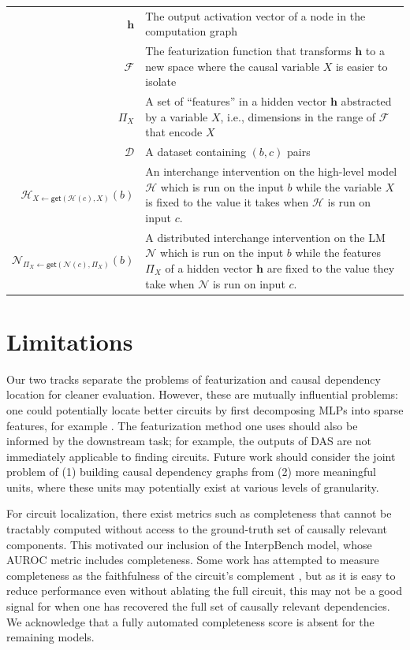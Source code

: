 \documentclass{article}
\theoremstyle{plain}
\theoremstyle{definition}
\theoremstyle{remark}
\begin{document}
\begin{table}
\begin{tabular}{p{1.8cm}rp{10cm}}
    & $\mathbf{h}$ & The output activation vector of a node in the computation graph \\
    & $\mathcal{F}$ & The featurization function that transforms $\mathbf{h}$ to a new space where the causal variable $X$ is easier to isolate \\
    & $\Pi_X$ & A set of ``features'' in a hidden vector $\mathbf{h}$ abstracted by a variable $X$, i.e., dimensions in the range of $\mathcal{F}$ that encode $X$ \\
    & $\mathcal{D}$ & A dataset containing $(b,c)$ pairs \\
    \multicolumn{2}{r}{$\mathcal{H} _{X \leftarrow \mathsf{get}(\mathcal{H}(c), X)}(b)$} & An interchange intervention on the high-level model $\mathcal{H}$ which is run on the input $b$ while the variable $X$ is fixed to the value it takes when $\mathcal{H}$ is run on input $c$.\\
    \multicolumn{2}{r}{$\mathcal{N}_{\Pi_X \leftarrow \mathsf{get}(\mathcal{N}(c), \Pi_X)}(b)$} & A distributed interchange intervention on the LM $\mathcal{N}$ which is run on the input $b$ while the features $\Pi_X$ of a hidden vector $\mathbf{h}$ are fixed to the value they take when $\mathcal{N}$ is run on input $c$.\\
    \bottomrule
    \end{tabular}
    \label{tab:notation}
\end{table}

\section{Limitations}
Our two tracks separate the problems of featurization and causal dependency location for cleaner evaluation. However, these are mutually influential problems: one could potentially locate better circuits by first decomposing MLPs into sparse features, for example \citep{marks2024sparsefeaturecircuitsdiscovering}. The featurization method one uses should also be informed by the downstream task; for example, the outputs of DAS are not immediately applicable to finding circuits. Future work should consider the joint problem of (1) building causal dependency graphs from (2) more meaningful units, where these units may potentially exist at various levels of granularity.

For circuit localization, there exist metrics such as completeness that cannot be tractably computed without access to the ground-truth set of causally relevant components. This motivated our inclusion of the InterpBench model, whose AUROC metric includes completeness. Some work has attempted to measure completeness as the faithfulness of the circuit's complement \citep{marks2024sparsefeaturecircuitsdiscovering}, but as it is easy to reduce performance even without ablating the full circuit, this may not be a good signal for when one has recovered the full set of causally relevant dependencies. We acknowledge that a fully automated completeness score is absent for the remaining models.
\end{document}
